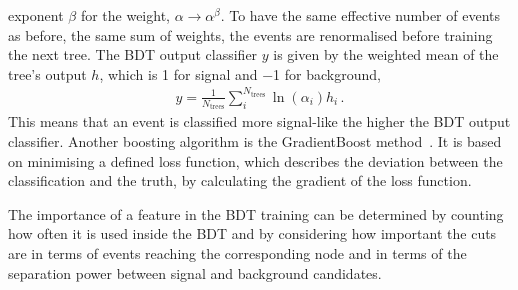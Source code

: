 exponent $\beta$ for the weight, $\alpha \to \alpha^{\beta}$. To have the same
effective number of events as before, \ie the same sum of weights, the events
are renormalised before training the next tree. The BDT output classifier $y$
is given by the weighted mean of the tree's output $h$, which is \num{+1} for
signal and \num{-1} for background,
\begin{align}
	y = \frac{1}{N_{\textrm{trees}}} \sum_i^{N_{\textrm{trees}}} \ln(\alpha_i) h_i\,.
\end{align}
This means that an event is classified more signal-like the higher the BDT
output classifier. Another boosting algorithm is the GradientBoost
method~\cite{GradientBoost}. It is based on minimising a defined loss
function, which describes the deviation between the classification and the
truth, by calculating the gradient of the loss function.

The importance of a feature in the BDT training can be determined by counting
how often it is used inside the BDT and by considering how important the cuts
are in terms of events reaching the corresponding node and in terms of the
separation power between signal and background candidates.